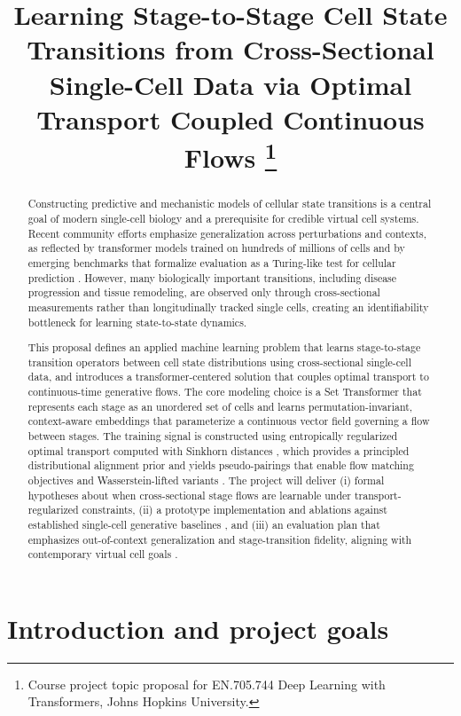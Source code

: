 \documentclass[conference]{IEEEtran}
\title{
Learning Stage-to-Stage Cell State Transitions from Cross-Sectional Single-Cell Data via Optimal Transport Coupled Continuous Flows
\thanks{Course project topic proposal for EN.705.744 Deep Learning with Transformers, Johns Hopkins University.}
}
\author{
\IEEEauthorblockN{AJ Book}
\IEEEauthorblockA{
Johns Hopkins University \\
EN.705.744 Deep Learning with Transformers \\
Email: abook3@jhu.edu
}
}
\begin{document}
\maketitle

\begin{abstract}
Constructing predictive and mechanistic models of cellular state transitions is a central goal of modern single-cell biology and a prerequisite for credible virtual cell systems. Recent community efforts emphasize generalization across perturbations and contexts, as reflected by transformer models trained on hundreds of millions of cells and by emerging benchmarks that formalize evaluation as a Turing-like test for cellular prediction \cite{Roohani2025-yb,Adduri2025-nt,Dong2026-fb}. However, many biologically important transitions, including disease progression and tissue remodeling, are observed only through cross-sectional measurements rather than longitudinally tracked single cells, creating an identifiability bottleneck for learning state-to-state dynamics.

This proposal defines an applied machine learning problem that learns stage-to-stage transition operators between cell state distributions using cross-sectional single-cell data, and introduces a transformer-centered solution that couples optimal transport to continuous-time generative flows. The core modeling choice is a Set Transformer \cite{Lee2018-ya} that represents each stage as an unordered set of cells and learns permutation-invariant, context-aware embeddings that parameterize a continuous vector field governing a flow between stages. The training signal is constructed using entropically regularized optimal transport computed with Sinkhorn distances \cite{Cuturi2013-li}, which provides a principled distributional alignment prior \cite{Bunne2024-pl,Bunne2023-bm} and yields pseudo-pairings that enable flow matching objectives \cite{Lipman2022-ns} and Wasserstein-lifted variants \cite{Haviv2024-qe}. The project will deliver (i) formal hypotheses about when cross-sectional stage flows are learnable under transport-regularized constraints, (ii) a prototype implementation and ablations against established single-cell generative baselines \cite{Lopez2018-ns,Piran2024-ca}, and (iii) an evaluation plan that emphasizes out-of-context generalization and stage-transition fidelity, aligning with contemporary virtual cell goals \cite{Roohani2025-yb,Adduri2025-nt,Dong2026-fb}.
\end{abstract}

\section{Introduction and project goals}
\end{document}
